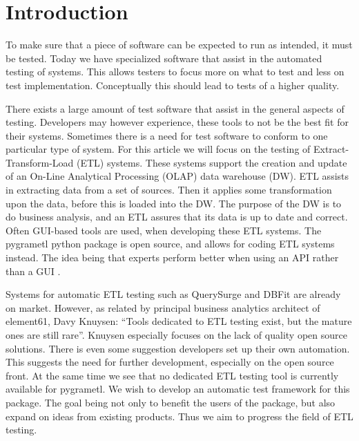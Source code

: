 \section*{Introduction} %

To make sure that a piece of software can be expected to run as intended, it must be tested. Today we have specialized software that assist in the automated testing of systems. This allows testers to focus more on what to test and less on test implementation. Conceptually this should lead to tests of a higher quality.

There exists a large amount of test software that assist in the general aspects of testing. Developers may however experience, these tools to not be the best fit for their systems. Sometimes there is a need for test software to conform to one particular type of system. For this article we will focus on the testing of Extract-Transform-Load (ETL) systems. These systems support the creation and update of an On-Line Analytical Processing (OLAP) data warehouse (DW). ETL assists in extracting data from a set of sources. Then it applies some transformation upon the data, before this is loaded into the DW. The purpose of the DW is to do business analysis, and an ETL assures that its data is up to date and correct. Often GUI-based tools are used, when developing these ETL systems. The pygrametl python package is open source, and allows for coding ETL systems instead. The idea being that experts perform better when using an API rather than a GUI \cite{thomsen2009pygrametl}. 

Systems for automatic ETL testing such as QuerySurge and DBFit are already on market. However, as related by principal business analytics architect of element61, Davy Knuysen: “Tools dedicated to ETL testing exist, but the mature ones are still rare”\cite{element61}. Knuysen especially focuses on the lack of quality open source solutions. There is even some suggestion developers set up their own automation. This suggests the need for further development, especially on the open source front. At the same time we see that no dedicated ETL testing tool is currently available for pygrametl.  We wish to  develop an automatic test framework for this package. The goal being not only to benefit the users of the package, but also expand on ideas from existing products. Thus we aim to progress  the field of ETL testing.  


